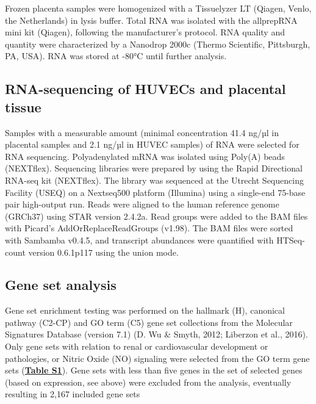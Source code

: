\documentclass[authordate, empirical,issue]{jote-new-article}
\begin{document}
Frozen placenta samples were homogenized with a Tissuelyzer LT (Qiagen, Venlo, the Netherlands) in lysis buffer. Total RNA was isolated with the allprepRNA mini kit (Qiagen), following the manufacturer's protocol. RNA quality and quantity were characterized by a Nanodrop 2000c (Thermo Scientific, Pittsburgh, PA, USA). RNA was stored at -80°C until further analysis.







\subsection{RNA-sequencing of HUVECs and placental tissue}



Samples with a measurable amount (minimal concentration 41.4 ng/µl in placental samples and 2.1 ng/µl in HUVEC samples) of RNA were selected for RNA sequencing. Polyadenylated mRNA was isolated using Poly(A) beads (NEXTflex). Sequencing libraries were prepared by using the Rapid Directional RNA-seq kit (NEXTflex). The library was sequenced at the Utrecht Sequencing Facility (USEQ) on a Nextseq500 platform (Illumina) using a single-end 75-base pair high-output run. Reads were aligned to the human reference genome (GRCh37) using STAR version 2.4.2a. Read groups were added to the BAM files with Picard's AddOrReplaceReadGroups (v1.98). The BAM files were sorted with Sambamba v0.4.5, and transcript abundances were quantified with HTSeq-count version 0.6.1p117 using the union mode.







\subsection{Gene set analysis }



Gene set enrichment testing was performed on the hallmark (H), canonical pathway (C2-CP) and GO term (C5) gene set collections from the Molecular Signatures Database (version 7.1) (D.
Wu \& Smyth, 2012; Liberzon et al., 2016). Only gene sets with relation to renal or cardiovascular development or pathologies, or Nitric Oxide (NO) signaling were selected from the GO term gene sets (\textbf{\href{https://journal.trialanderror.org/pub/prenatal-sildenafil-pregnancies\#supplementary-materials}{Table S1}}). Gene sets with less than five genes in the set of selected genes (based on expression, see above) were excluded from the analysis, eventually resulting in 2,167 included gene sets
\end{document}
